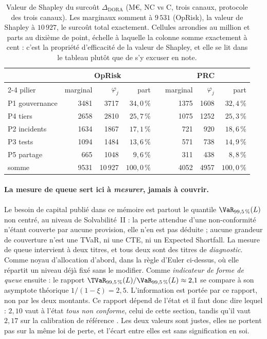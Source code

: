 \begin{table}[H]\centering\small
\renewcommand{\arraystretch}{1.25}
\begin{tabular}{@{}l rrr c rrr@{}}
\toprule
& \multicolumn{3}{c}{OpRisk} & & \multicolumn{3}{c}{PRC} \\
\cmidrule{2-4}\cmidrule{6-8}
pilier & marginal & $\varphi_j$ & part & & marginal & $\varphi_j$ & part \\
\midrule
P1 gouvernance & 3481 & 3717 & $34{,}0\,\%$ & & 1375 & 1608 & $32{,}4\,\%$ \\
P4 tiers       & 2658 & 2810 & $25{,}7\,\%$ & & 1075 & 1252 & $25{,}3\,\%$ \\
P2 incidents   & 1634 & 1867 & $17{,}1\,\%$ & &  721 &  920 & $18{,}6\,\%$ \\
P3 tests       & 1094 & 1484 & $13{,}6\,\%$ & &  571 &  738 & $14{,}9\,\%$ \\
P5 partage     &  665 & 1048 &  $9{,}6\,\%$ & &  311 &  438 &  $8{,}8\,\%$ \\
\midrule
somme          & 9531 & 10\,927 & $100{,}0\,\%$ & & 4052 & 4957 & $100{,}0\,\%$ \\
\bottomrule
\end{tabular}
\caption{Valeur de Shapley du surcoût $\Delta_{\text{DORA}}$ (M\euro, NC vs C, trois canaux,
protocole des trois canaux). Les marginaux somment à $9\,531$ (OpRisk), la valeur de
Shapley à $10\,927$, le surcoût total exactement. Cellules arrondies au million et parts au
dixième de point, échelle à laquelle la colonne somme exactement à cent : c'est la propriété
d'efficacité de la valeur de Shapley, et elle se lit dans le tableau plutôt que de s'y
excuser en note.}
\end{table}

\paragraph{La mesure de queue sert ici à \emph{mesurer}, jamais à couvrir.} Le besoin de capital
publié dans ce mémoire est partout le quantile $\VaR_{99{,}5\,\%}(L)$ non centré, au niveau de
Solvabilité~II : la perte attendue d'une non-conformité n'étant couverte par aucune provision,
elle n'en est pas déduite ; aucune
grandeur de couverture n'est une TVaR, ni une CTE, ni un Expected Shortfall. La mesure
de queue intervient à deux titres, et tous deux sont des titres de \emph{diagnostic}. Comme
noyau d'allocation d'abord, dans la règle d'Euler ci-dessus, où elle répartit un niveau déjà
fixé sans le modifier. Comme \emph{indicateur de forme de queue} ensuite : le rapport
$\TVaR_{99{,}5\,\%}(L)/\VaR_{99{,}5\,\%}(L) \approx 2{,}1$ se compare à son asymptote théorique
$1/(1-\xi) = 2{,}5$. L'information est portée par ce rapport, non par les deux montants.
Ce rapport dépend de l'état et il faut
donc dire lequel : $2{,}10$ vaut à l'état \emph{tous non conforme}, celui de cette section, tandis
qu'il vaut $2{,}17$ sur la calibration de référence \matcomp. Les deux
valeurs sont justes, elles ne portent pas sur la même loi de perte, et l'écart entre elles est
sans signification en soi.

